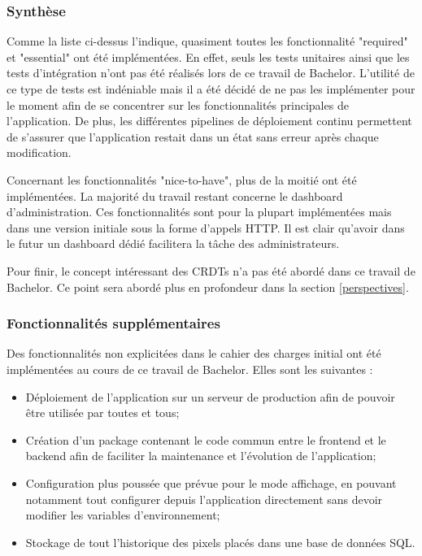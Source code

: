 \subsubsection{Synthèse}

Comme la liste ci-dessus l'indique, quasiment toutes les fonctionnalité "required" et "essential" ont été implémentées. En effet, seuls les tests unitaires ainsi que les tests d'intégration n'ont pas été réalisés lors de ce travail de Bachelor. L'utilité de ce type de tests est indéniable mais il a été décidé de ne pas les implémenter pour le moment afin de se concentrer sur les fonctionnalités principales de l'application. De plus, les différentes pipelines de déploiement continu permettent de s'assurer que l'application restait dans un état sans erreur après chaque modification.

Concernant les fonctionnalités "nice-to-have", plus de la moitié ont été implémentées. La majorité du travail restant concerne le dashboard d'administration. Ces fonctionnalités sont pour la plupart implémentées mais dans une version initiale sous la forme d'appels HTTP. Il est clair qu'avoir dans le futur un dashboard dédié facilitera la tâche des administrateurs.

Pour finir, le concept intéressant des CRDTs n'a pas été abordé dans ce travail de Bachelor. Ce point sera abordé plus en profondeur dans la section \ref{perspectives}.

\subsubsection{Fonctionnalités supplémentaires}

Des fonctionnalités non explicitées dans le cahier des charges initial ont été implémentées au cours de ce travail de Bachelor. Elles sont les suivantes :


\begin{itemize}
  \item Déploiement de l'application sur un serveur de production afin de pouvoir être utilisée par toutes et tous;
  \item Création d'un package contenant le code commun entre le frontend et le backend afin de faciliter la maintenance et l'évolution de l'application;
  \item Configuration plus poussée que prévue pour le mode affichage, en pouvant notamment tout configurer depuis l'application directement sans devoir modifier les variables d'environnement;
  \item Stockage de tout l'historique des pixels placés dans une base de données SQL.
\end{itemize}

